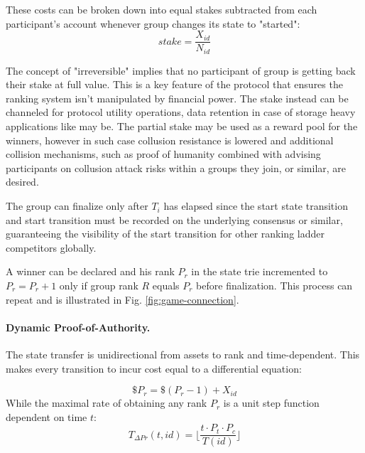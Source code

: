 \documentclass{article}
\begin{document}
\begin{CJK}{UTF8}{gbsn}
    These costs can be broken down into equal stakes subtracted from each participant's account whenever group changes its state to "started":
    \begin{equation}
        \label{eq:join-fee}
        stake = \dfrac{X_{id}}{ N_{id}}
    \end{equation}
    
    The concept of "irreversible" implies that no participant of group is getting back their stake at full value. This is a key feature of the protocol that ensures the ranking system isn't manipulated by financial power. The stake instead can be channeled for protocol utility operations, data retention in case of storage heavy applications like \cite{cvpp} may be. The partial stake may be used as a reward pool for the winners, however in such case collusion resistance is lowered and additional collision mechanisms, such as proof of humanity \cite{WorldCoin2024} combined with advising participants on collusion attack risks within a groups they join, or similar, are desired.



    The group can finalize only after $T_{i}$ has elapsed since the start state transition and start transition must be recorded on the underlying consensus or similar, guaranteeing the visibility of the start transition for other ranking ladder competitors globally.

    A winner can be declared and his rank $P_r$ in the state trie incremented to $P_r=P_r+1$ only if group rank $R$ equals $P_r$ before finalization. This process can repeat and is illustrated in Fig. \ref*{fig:game-connection}.

    \paragraph{Dynamic Proof-of-Authority.} The state transfer is unidirectional from assets to rank and time-dependent. This makes every transition to incur cost equal to a differential equation:

    \begin{equation}
        \label{eq:time-weighted-proof-of-authority}
        \$P_r = \$(P_r-1) + X_{id}
    \end{equation}
    While the maximal rate of obtaining any rank $P_r$ is a unit step function dependent on time $t$:
    \begin{equation}
        \label{eq:time-weighted-proof-of-authority-1}
        T_{\Delta Pr}(t,id) = \lfloor \dfrac{t \cdot P_t \cdot P_c}{T(id)} \rfloor
    \end{equation}


\end{CJK}
\end{document}
